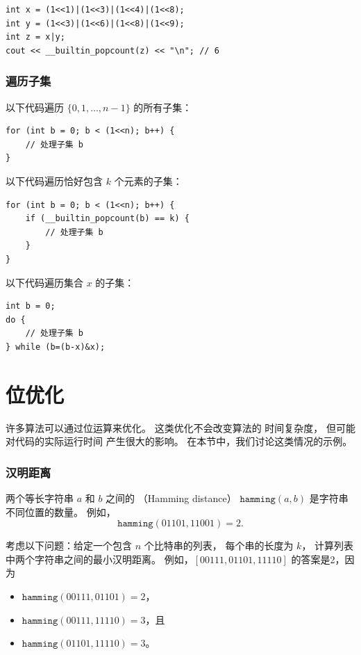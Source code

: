 \begin{lstlisting}
int x = (1<<1)|(1<<3)|(1<<4)|(1<<8);
int y = (1<<3)|(1<<6)|(1<<8)|(1<<9);
int z = x|y;
cout << __builtin_popcount(z) << "\n"; // 6
\end{lstlisting}

\subsubsection{遍历子集}

以下代码遍历 $\{0,1,\ldots,n-1\}$ 的所有子集：

\begin{lstlisting}
for (int b = 0; b < (1<<n); b++) {
    // 处理子集 b
}
\end{lstlisting}
以下代码遍历恰好包含 $k$ 个元素的子集：
\begin{lstlisting}
for (int b = 0; b < (1<<n); b++) {
    if (__builtin_popcount(b) == k) {
        // 处理子集 b
    }
}
\end{lstlisting}
以下代码遍历集合 $x$ 的子集：
\begin{lstlisting}
int b = 0;
do {
    // 处理子集 b
} while (b=(b-x)&x);
\end{lstlisting}

\section{位优化}

许多算法可以通过位运算来优化。
这类优化不会改变算法的
时间复杂度，
但可能对代码的实际运行时间
产生很大的影响。
在本节中，我们讨论这类情况的示例。

\subsubsection{汉明距离}

两个等长字符串 $a$ 和 $b$ 之间的
（Hamming distance）
$\texttt{hamming}(a,b)$ 是字符串不同位置的数量。
例如，
\[\texttt{hamming}(01101,11001)=2.\]

考虑以下问题：给定一个包含 $n$ 个比特串的列表，
每个串的长度为 $k$，
计算列表中两个字符串之间的最小汉明距离。
例如，$[00111,01101,11110]$ 的答案是2，因为
\begin{itemize}[noitemsep]
\item $\texttt{hamming}(00111,01101)=2$，
\item $\texttt{hamming}(00111,11110)=3$，且
\item $\texttt{hamming}(01101,11110)=3$。
\end{itemize}

